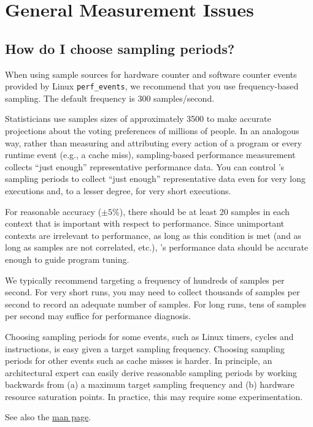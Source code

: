 \documentclass[11pt,twoside,letterpaper]{report}
\begin{document}
\section{General Measurement Issues}

\subsection{How do I choose sampling periods?}
\label{sec:troubleshooting:hpcrun-sample-periods}

When using sample sources for hardware counter and software counter events provided by Linux \verb|perf_events|,
we recommend that you use frequency-based sampling. The default frequency is 300 samples/second.

Statisticians use samples sizes of approximately 3500 to make accurate projections about the voting preferences of millions of people.
In an analogous way, rather than measuring and attributing every action of a program or every runtime event (e.g., a cache miss), sampling-based performance measurement collects ``just enough'' representative performance data.
You can control \hpcrun{}'s sampling periods to collect ``just enough'' representative data even for very long executions and, to a lesser degree, for very short executions.

For reasonable accuracy ($\pm 5\%$), there should be at least 20 samples in each context that is important with respect to performance.
Since unimportant contexts are irrelevant to performance, as long as this condition is met (and as long as samples are not correlated, etc.), \HPCToolkit{}'s performance data should be accurate enough to guide program tuning.

We typically recommend targeting a frequency of hundreds of samples per second.
For very short runs, you may need to collect thousands of samples per second to record an adequate number of samples.
For long runs, tens of samples per second may suffice for performance diagnosis.

Choosing sampling periods for some events, such as Linux timers, cycles and instructions, is easy given a target sampling frequency.
Choosing sampling periods for other events such as cache misses is harder.
In principle, an architectural expert can easily derive reasonable sampling periods by working backwards from (a) a maximum target sampling frequency and (b) hardware resource saturation points.
In practice, this may require some experimentation.

See also the \hpcrun{} \href{http://hpctoolkit.org/man/hpcrun.html}{man page}.
\end{document}
